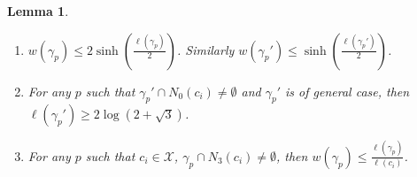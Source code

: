 \documentclass[11pt, a4paper]{article}
\newtheorem{lemma}[thm]{Lemma}
\theoremstyle{definition}
\theoremstyle{remark}
\newcommand{\calx}{\mathcal{X}}
\newcommand{\bracket}[1]{\left( #1 \right)}
\begin{document}
\begin{lemma}\label{lemma_32}

\begin{enumerate}
\item
   $w(\gamma_p)\leqslant 2\sinh\bracket{\frac{\ell(\gamma_p)}2}$. Similarly $w(\gamma_p')\leqslant \sinh\bracket{\frac{\ell(\gamma_p')}2}$.

\item
   For any $p$ such that $\gamma_p'\cap N_0(c_i)\neq\emptyset$ and $\gamma_p'$ is of general case, then $\ell(\gamma_p')\geqslant2\log(2+\sqrt3)$.

\item
For any $p$ such that $c_i\in\calx$, $\gamma_p\cap N_3(c_i)\neq\emptyset$, then $w(\gamma_p)\leqslant\frac{\ell(\gamma_p)}{\ell(c_i)}$.
\end{enumerate}
\end{lemma}
\end{document}

